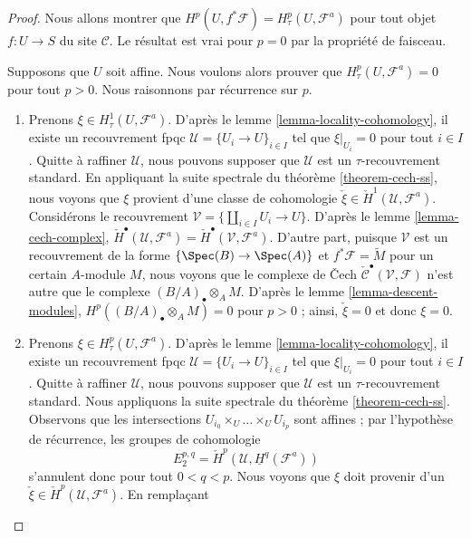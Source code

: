 \begin{proof}
Nous allons montrer que
$H^p(U, f^*\mathcal{F}) = H^p_\tau(U, \mathcal{F}^a)$
pour tout objet $f : U \to S$ du site $\mathcal{C}$.
Le r\'esultat est vrai pour $p = 0$ par la propri\'et\'e de faisceau.

\medskip\noindent
Supposons que $U$ soit affine. Nous voulons alors prouver que
$H^p_\tau(U, \mathcal{F}^a) = 0$ pour tout $p > 0$. Nous raisonnons par r\'ecurrence sur $p$.
\begin{enumerate}
\item[p = 1]
Prenons $\xi \in H^1_\tau(U, \mathcal{F}^a)$.
D'apr\`es le lemme \ref{lemma-locality-cohomology},
il existe un recouvrement fpqc $\mathcal{U} = \{U_i \to U\}_{i \in I}$
tel que $\xi|_{U_i} = 0$ pour tout $i \in I$. Quitte \`a raffiner
$\mathcal{U}$, nous pouvons supposer que $\mathcal{U}$ est un
$\tau$-recouvrement standard. En appliquant la suite spectrale du
th\'eor\`eme \ref{theorem-cech-ss},
nous voyons que $\xi$ provient d'une classe de cohomologie
$\check \xi \in \check H^1(\mathcal{U}, \mathcal{F}^a)$.
Consid\'erons le recouvrement $\mathcal{V} = \{\coprod_{i\in I} U_i \to U\}$. D'apr\`es le
lemme \ref{lemma-cech-complex},
$\check H^\bullet(\mathcal{U}, \mathcal{F}^a) =
\check H^\bullet(\mathcal{V}, \mathcal{F}^a)$.
D'autre part, puisque $\mathcal{V}$ est un recouvrement de la forme
$\{\Spec(B) \to \Spec(A)\}$ et $f^*\mathcal{F} = \widetilde{M}$
pour un certain $A$-module $M$, nous voyons que le complexe de {\v C}ech
$\check{\mathcal{C}}^\bullet(\mathcal{V}, \mathcal{F})$
n'est autre que le complexe $(B/A)_\bullet \otimes_A M$.
D'apr\`es le lemme \ref{lemma-descent-modules},
$H^p((B/A)_\bullet \otimes_A M) = 0$ pour $p > 0$ ; ainsi, $\check \xi = 0$
et donc $\xi = 0$.
\item[p > 1]
Prenons $\xi \in H^p_\tau(U, \mathcal{F}^a)$. D'apr\`es le
lemme \ref{lemma-locality-cohomology},
il existe un recouvrement fpqc $\mathcal{U} = \{U_i \to U\}_{i \in I}$
tel que $\xi|_{U_i} = 0$ pour tout $i \in I$. Quitte \`a raffiner
$\mathcal{U}$, nous pouvons supposer que $\mathcal{U}$ est un
$\tau$-recouvrement standard. Nous appliquons la suite spectrale du
th\'eor\`eme \ref{theorem-cech-ss}.
Observons que les intersections $U_{i_0} \times_U \ldots \times_U U_{i_p}$
sont affines ; par l'hypoth\`ese de r\'ecurrence, les groupes de cohomologie
$$
E_2^{p, q} = \check H^p(\mathcal{U}, \underline{H}^q(\mathcal{F}^a))
$$
s'annulent donc pour tout $0 < q < p$. Nous voyons que $\xi$ doit provenir d'un
$\check \xi \in \check H^p(\mathcal{U}, \mathcal{F}^a)$. En rempla\c{c}ant

\end{enumerate}
\end{proof}
